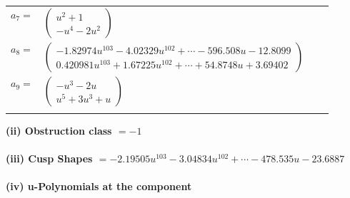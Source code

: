 \documentclass[1p]{elsarticle_modified}
\theoremstyle{definition}
\begin{document}
\begin{tabular}{m{7pt} m{180pt} m{7pt} m{180pt} }
\flushright $a_{7}=$&$\begin{pmatrix}u^2+1\\- u^4-2 u^2\end{pmatrix}$ \\
\flushright $a_{8}=$&$\begin{pmatrix}-1.82974 u^{103}-4.02329 u^{102}+\cdots-596.508 u-12.8099\\0.420981 u^{103}+1.67225 u^{102}+\cdots+54.8748 u+3.69402\end{pmatrix}$ \\
\flushright $a_{9}=$&$\begin{pmatrix}- u^3-2 u\\u^5+3 u^3+u\end{pmatrix}$\\&\end{tabular}
\flushleft \textbf{(ii) Obstruction class $= -1$}\\~\\
\flushleft \textbf{(iii) Cusp Shapes $= -2.19505 u^{103}-3.04834 u^{102}+\cdots-478.535 u-23.6887$}\\~\\
\newpage\renewcommand{\arraystretch}{1}
\flushleft \textbf{(iv) u-Polynomials at the component}\newline \\
\end{document}
